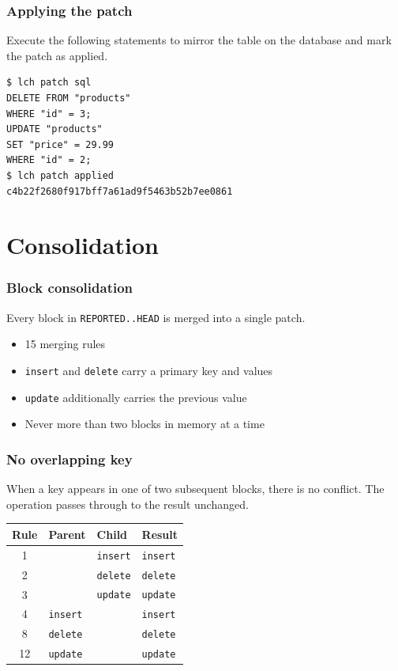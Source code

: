 \documentclass{beamer}
\begin{document}
\begin{frame}[fragile]
\frametitle{Applying the patch}
Execute the following statements to mirror the table on the database and mark
the patch as applied.
\begin{verbatim}
$ lch patch sql
DELETE FROM "products"
WHERE "id" = 3;
UPDATE "products"
SET "price" = 29.99
WHERE "id" = 2;
$ lch patch applied
c4b22f2680f917bff7a61ad9f5463b52b7ee0861
\end{verbatim}
\end{frame}

\section{Consolidation}

\begin{frame}
\frametitle{Block consolidation}
Every block in \texttt{REPORTED..HEAD} is merged into a single patch.
\begin{itemize}
\item 15 merging rules
\item \texttt{insert} and \texttt{delete} carry a primary key and values
\item \texttt{update} additionally carries the previous value
\item Never more than two blocks in memory at a time
\end{itemize}
\end{frame}

\begin{frame}
\frametitle{No overlapping key}
When a key appears in one of two subsequent blocks, there is no conflict. The
operation passes through to the result unchanged.
\medskip
\begin{table}
\centering
\begin{tabular}{clll}
Rule & Parent & Child & Result \\
\hline
1  &                 & \texttt{insert} & \texttt{insert} \\
2  &                 & \texttt{delete} & \texttt{delete} \\
3  &                 & \texttt{update} & \texttt{update} \\
4  & \texttt{insert} &                 & \texttt{insert} \\
8  & \texttt{delete} &                 & \texttt{delete} \\
12 & \texttt{update} &                 & \texttt{update}
\end{tabular}
\end{table}
\end{frame}
\end{document}
